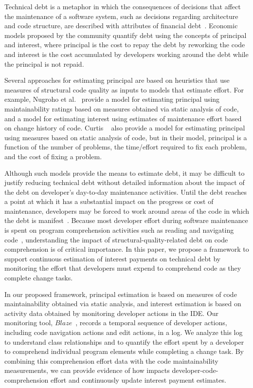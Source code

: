 Technical debt is a metaphor in which the consequences of decisions that affect the maintenance of a software system, such as decisions regarding architecture and code structure, are described with attributes of financial debt~\cite{Cunningham:1992}. Economic models proposed by the \TD community quantify debt using the concepts of principal and interest, where principal is the cost to repay the debt by reworking the code and interest is the cost accumulated by developers working around the debt while the principal is not repaid.

Several approaches for estimating principal are based on heuristics that use measures of structural code quality as inputs to models that estimate effort. For example, Nugroho et al.~\cite{Nugroho_etal:2011} provide a model for estimating principal using maintainability ratings based on measures obtained via static analysis of code, and a model for estimating interest using estimates of maintenance effort based on change history of code. Curtis \etal~\cite{Curtis_etal:2012} also provide a model for estimating principal using measures based on static analysis of code, but in their model, principal is a function of the number of problems, the time/effort required to fix each problem, and the cost of fixing a problem.

Although such models provide the means to estimate debt, it may be difficult to justify reducing technical debt without detailed information about the impact of the debt on developer's day-to-day maintenance activities. Until the debt reaches a point at which it has a substantial impact on the progress or cost of maintenance, developers may be forced to work around areas of the code in which the debt is manifest~\cite{Ozkaya_etal:2011}. 
Because most developer effort during software maintenance is spent on program comprehension activities such as reading and navigating code~\cite{Fjeldstad_Hamlen:1982,Standish:1984,vonMayrhauser_etal:1997,Ko_etal:2006,LaToza_etal:2006,Tiarks:2011}, understanding the impact of structural-quality-related debt on code comprehension is of critical importance. In this paper, we propose a framework to support continuous estimation of interest payments on technical debt by monitoring the effort that developers must expend to comprehend code as they complete change tasks. 

In our proposed framework, principal estimation is based on measures of code maintainability obtained via static analysis, and interest estimation is based on activity data obtained by monitoring developer actions in the IDE. Our monitoring tool, $Blaze$~\cite{Snipes_etal:2014}, records a temporal sequence of developer actions, including code navigation actions and edit actions, in a log. We analyze this log to understand class relationships and to quantify the effort spent by a developer to comprehend individual program elements while completing a change task. By combining this comprehension effort data with the code maintainability measurements, we can provide evidence of how \TD impacts developer-code-comprehension effort and continuously update interest payment estimates.

